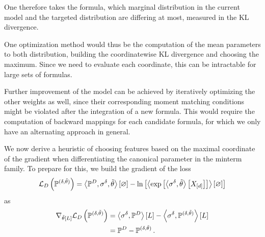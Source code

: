 

One therefore takes the formula, which marginal distribution in the current model and the targeted distribution are differing at most, measured in the KL divergence.

One optimization method would thus be the computation of the mean parameters to both distribution, building the coordinatewise KL divergence and choosing the maximum.
Since we need to evaluate each coordinate, this can be intractable for large sets of formulas.


Further improvement of the model can be achieved by iteratively optimizing the other weights as well, since their corresponding moment matching conditions might be violated after the integration of a new formula.
This would require the computation of backward mappings for each candidate formula, for which we only have an alternating approach in general.





We now derive a heuristic of choosing features based on the maximal coordinate of the gradient when differentiating the canonical parameter in the minterm family.
To prepare for this, we build the gradient of the loss
\begin{align*}
	\mathcal{L}_{D}\left(\mathbb{P}^{(\delta, \tilde{\theta})}\right)
	= \left\langle \mathbb{P}^{D}, \sigma^{\delta}, \tilde{\theta}\right\rangle \left[ \varnothing \right] - \ln \left[ \left\langle \mathrm{exp}\left[\left\langle \sigma^{\delta}, \tilde{\theta}\right\rangle \left[ X_{[d]} \right]\right]\right\rangle \left[ \varnothing \right] \right]
\end{align*}
as
\begin{align*}
	\nabla_{\tilde{\theta}\left[L\right]} \mathcal{L}_{D}\left(\mathbb{P}^{(\delta, \tilde{\theta})}\right)
	&= \left\langle \sigma^{\delta},\mathbb{P}^{D}\right\rangle \left[ L \right] - \left\langle \sigma^{\delta},\mathbb{P}^{(\delta, \tilde{\theta})}\right\rangle \left[ L \right] \\
	&= \mathbb{P}^{D} - \mathbb{P}^{(\delta, \tilde{\theta})} \, .
\end{align*}

